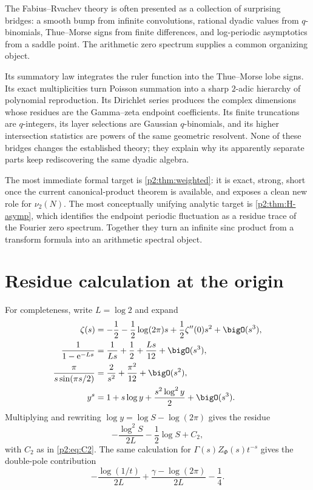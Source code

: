 \documentclass[11pt]{article}
\numberwithin{equation}{section}
\theoremstyle{definition}
\theoremstyle{remark}
\newcommand{\e}{\mathrm e}
\begin{document}
The Fabius--Rvachev theory is often presented as a collection of surprising
bridges: a smooth bump from infinite convolutions, rational dyadic values from
$q$-binomials, Thue--Morse signs from finite differences, and log-periodic
asymptotics from a saddle point.  The arithmetic zero spectrum supplies a common
organizing object.

Its summatory law integrates the ruler function into the Thue--Morse lobe signs.
Its exact multiplicities turn Poisson summation into a sharp $2$-adic hierarchy
of polynomial reproduction.  Its Dirichlet series produces the complex
dimensions whose residues are the Gamma--zeta endpoint coefficients.  Its finite
truncations are $q$-integers, its layer selections are Gaussian $q$-binomials,
and its higher intersection statistics are powers of the same geometric
resolvent.  None of these bridges changes the established theory; they explain
why its apparently separate parts keep rediscovering the same dyadic algebra.

The most immediate formal target is \cref{p2:thm:weighted}: it is exact, strong,
short once the current canonical-product theorem is available, and exposes a
clean new role for $\nu_2(N)$.  The most conceptually unifying analytic target is
\cref{p2:thm:H-asymp}, which identifies the endpoint periodic fluctuation as a
residue trace of the Fourier zero spectrum.  Together they turn an infinite sinc
product from a transform formula into an arithmetic spectral object.

\appendix
\renewcommand*{\theHsection}{\arabic{part}.\arabic{section}}

\section{Residue calculation at the origin}
\label{p2:app:residue}

For completeness, write $L=\log2$ and expand
\begin{align*}
 \zeta(s)&=-\frac12-\frac12\log(2\pi)s+\frac12\zeta''(0)s^2+\bigO(s^3),\\
 \frac1{1-\e^{-Ls}}&=\frac1{Ls}+\frac12+\frac{Ls}{12}+\bigO(s^3),\\
 \frac{\pi}{s\sin(\pi s/2)}&=\frac2{s^2}+\frac{\pi^2}{12}+\bigO(s^2),\\
 y^s&=1+s\log y+\frac{s^2\log^2y}{2}+\bigO(s^3).
\end{align*}
Multiplying and rewriting $\log y=\log S-\log(2\pi)$ gives the residue
\[
 -\frac{\log^2S}{2L}-\frac12\log S+C_2,
\]
with $C_2$ as in \eqref{p2:eq:C2}.  The same calculation for
$\Gamma(s)Z_\Phi(s)t^{-s}$ gives the double-pole contribution
\[
 -\frac{\log(1/t)}{2L}+\frac{\gamma-\log(2\pi)}{2L}-\frac14.
\]
\end{document}
